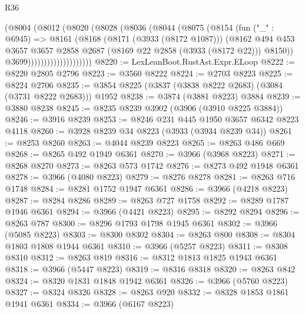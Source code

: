 \begin{lexlean}{R36}
\begin{coremodule}
                          (@8004
                            (@8012
                              (@8020
                                (@8028
                                  (@8036
                                    (@8044
                                      (@8075
                                        (@8154
                                          (fun ("_" : @6945) =>
                                          @8161
                                            (@8168
                                              (@8171 (@3933 (@8172 @1087)))
                                              (@8162
                                                @494
                                                @453
                                                @3657
                                                @3657
                                                @2858
                                                @2687
                                                (@8169 @22 @2858 (@3933 (@8172 @22)))
                                                @8150))
                                            @3699))))))))))))))))))))
@8220 := LexLeanBoot.RustAst.Expr.ELoop
@8222 := @8220 @2805 @2796
@8223 := @3560 @8222
@8224 := @2703 @8223
@8225 := @8224 @2706
@8235 := @3854 @8225 (@3837 (@3838 @8222 @2683) (@3084 (@3731 @8222 @2683))) @1952
@8238 := @3874 (@3881 @8223) @3884
@8239 := @3880 @8238
@8245 := @8235 @8239 @3902 (@3906 (@3910 @8225 @3884))
@8246 := @3916 @8239
@8253 := @8246 @231 @445 @1950 @3657 @6342 @8223 @4118
@8260 := @3928 @8239 @34 @8223 (@3933 (@3934 @8239 @34))
@8261 := @8253 @8260
@8263 := @4044 @8239 @8223
@8265 := @8263 @486 @669
@8268 := @8265 @492 @1949 @6361
@8270 := @3966 (@3968 @8223)
@8271 := @8268 @8270
@8273 := @8263 @573 @1742
@8276 := @8273 @492 @1948 @6361
@8278 := @3966 (@4080 @8223)
@8279 := @8276 @8278
@8281 := @8263 @716 @1748
@8284 := @8281 @1752 @1947 @6361
@8286 := @3966 (@4218 @8223)
@8287 := @8284 @8286
@8289 := @8263 @727 @1758
@8292 := @8289 @1787 @1946 @6361
@8294 := @3966 (@4421 @8223)
@8295 := @8292 @8294
@8296 := @8263 @787
@8300 := @8296 @1793 @1798 @1945 @6361
@8302 := @3966 (@5085 @8223)
@8303 := @8300 @8302
@8304 := @8263 @800
@8308 := @8304 @1803 @1808 @1944 @6361
@8310 := @3966 (@5257 @8223)
@8311 := @8308 @8310
@8312 := @8263 @819
@8316 := @8312 @1813 @1825 @1943 @6361
@8318 := @3966 (@5447 @8223)
@8319 := @8316 @8318
@8320 := @8263 @842
@8324 := @8320 @1831 @1848 @1942 @6361
@8326 := @3966 (@5760 @8223)
@8327 := @8324 @8326
@8328 := @8263 @920
@8332 := @8328 @1853 @1861 @1941 @6361
@8334 := @3966 (@6167 @8223)

\end{coremodule}
\end{lexlean}
